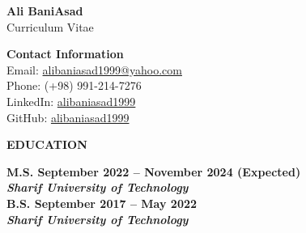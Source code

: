 \documentclass[12pt]{article}
\begin{document}

\begin{center}
	{\Large \bfseries Ali BaniAsad} \\ 
	\vspace{4pt}
	{\large Curriculum Vitae} 	
\end{center}

	{\noindent \bf Contact Information} \\ 
	\href{mailto:alibaniasad1999@yahoo.com}{\faEnvelope} Email: \href{mailto:alibaniasad1999@yahoo.com}{alibaniasad1999@yahoo.com}   \\ 
	\faPhone \hspace{0pt}
	Phone: (+98) 991-214-7276  \\ 
	\href{https://linkedin.com/in/alibaniasad1999/}{\textcolor{blue}{\faLinkedin}}
	LinkedIn: \href{https://linkedin.com/in/alibaniasad1999/}{alibaniasad1999} \\
	\href{https://github.com/alibaniasad1999}{\faGithub}
	GitHub: \href{https://github.com/alibaniasad1999}{alibaniasad1999}


\begin{center} %
	{\noindent \bfseries EDUCATION}
\end{center} %

\vspace{8pt} %

\noindent
 \bf{M.S.}
  \hfill September 2022 -- November 2024 (Expected) \\ 
\noindent \textit{Sharif University of Technology} \\

\noindent
 \bf{B.S.}
 \hfill September 2017 -- May 2022 \\ 
\noindent \textit{Sharif University of Technology} \\
 

\end{document}
